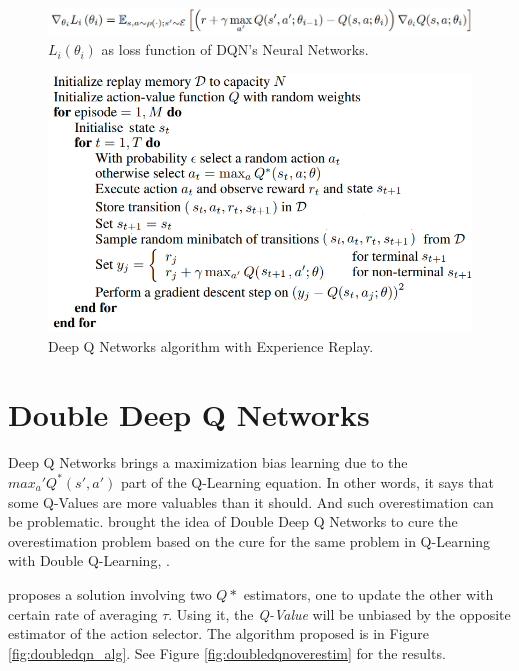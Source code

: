 \begin{figure}[H]
    \centering
    \includegraphics[scale=0.3]{images/dqn_lossfunc.png}
    \caption{$L_i(\theta_i)$ as loss function of DQN's Neural Networks.}
    \label{fig:dqnfuncloss}
\end{figure}

\begin{figure}[H]
    \centering
    \includegraphics[scale=0.5]{images/dqn_alg.png}
    \caption{Deep Q Networks algorithm with Experience Replay.}
    \label{fig:dqn_alg}
\end{figure}

\section{Double Deep Q Networks}\label{section:ddqn}
Deep Q Networks brings a maximization bias learning due to the $max_a' Q^*(s',a')$ part of the Q-Learning equation. In other words, it says that some Q-Values are more valuables than it should. And such overestimation can be problematic. \cite{doubledqn} brought the idea of Double Deep Q Networks to cure the overestimation problem based on the cure for the same problem in Q-Learning with Double Q-Learning, \cite{doubleqlearning}.

\cite{doubledqn} proposes a solution involving two $Q*$ estimators, one to update the other with certain rate of averaging $\tau$. Using it, the \textit{Q-Value} will be unbiased by the opposite estimator of the action selector. The algorithm proposed is in Figure \ref{fig:doubledqn_alg}. See Figure \ref{fig:doubledqnoverestim} for the results.

